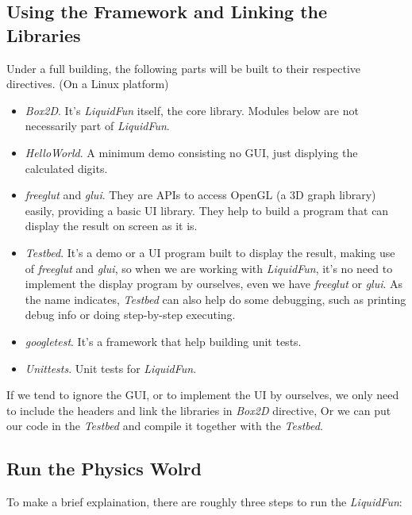 \documentclass[UTF8]{ctexart}
\begin{document}
        \subsection{Using the Framework and Linking the Libraries}

            Under a full building, the following parts will be built to their respective directives. (On a Linux platform)

            \begin{itemize}
                \item \textit{Box2D}. It's \textit{LiquidFun} itself, the core library. Modules below are not necessarily part of \textit{LiquidFun}.
                \item \textit{HelloWorld}. A minimum demo consisting no GUI, just displying the calculated digits.
                \item \textit{freeglut} and \textit{glui}. They are APIs to access OpenGL (a 3D graph library) easily, providing a basic UI library. They help to build a program that can display the result on screen as it is.
                \item \textit{Testbed}. It's a demo or a UI program built to display the result, making use of \textit{freeglut} and \textit{glui}, so when we are working with \textit{LiquidFun}, it's no need to implement the display program by ourselves, even we have \textit{freeglut} or \textit{glui}. As the name indicates, \textit{Testbed} can also help do some debugging, such as printing debug info or doing step-by-step executing.
                \item \textit{googletest}. It's a framework that help building unit tests.
                \item \textit{Unittests}. Unit tests for \textit{LiquidFun}.
            \end{itemize}
            
            If we tend to ignore the GUI, or to implement the UI by ourselves, we only need to include the headers and link the libraries in \textit{Box2D} directive, Or we can put our code in the \textit{Testbed} and compile it together with the \textit{Testbed}.

        \subsection{Run the Physics Wolrd}

            To make a brief explaination, there are roughly three steps to run the \textit{LiquidFun}:
\end{document}
